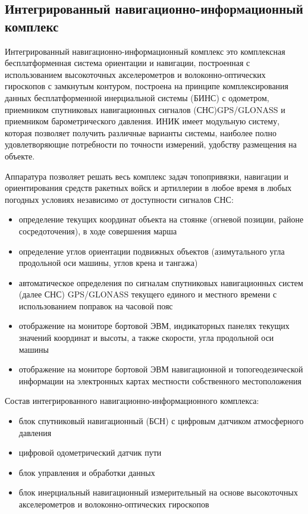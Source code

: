 \subsection{Интегрированный навигационно-информационный комплекс}
\label{sub:lit_review:ins}

Интегрированный навигационно-информационный комплекс это комплексная бесплатформенная система ориентации и навигации,
построенная с использованием высокоточных акселерометров и волоконно-оптических гироскопов с замкнутым контуром,
построена на принципе комплексирования данных бесплатформенной инерциальной системы (БИНС) с одометром, приемником спутниковых навигационных сигналов (СНС)\break GPS/GLONASS и приемником барометрического давления.
ИНИК имеет модульную систему, которая позволяет получить различные варианты системы, наиболее полно удовлетворяющие потребности по точности измерений, удобству размещения на объекте.

Аппаратура позволяет  решать весь комплекс задач топопривязки, навигации и ориентирования средств ракетных войск и артиллерии в любое время в любых погодных условиях независимо от доступности сигналов СНС:
\begin{itemize}
	\item определение текущих координат объекта на стоянке (огневой позиции, районе сосредоточения), в ходе совершения марша
	\item определение углов ориентации подвижных объектов (азимутального угла продольной оси машины, углов крена и тангажа)
	\item автоматическое определения по сигналам спутниковых навигационных систем (далее СНС) GPS/GLONASS текущего единого и местного времени с использованием поправок на часовой пояс
	\item отображение на мониторе бортовой ЭВМ, индикаторных панелях текущих значений координат и высоты, а также скорости, угла продольной оси машины
	\item отображение на мониторе бортовой ЭВМ навигационной и топогеодезической информации на электронных картах местности собственного местоположения
\end{itemize}

Состав интегрированного навигационно-информационного комплекса:
\begin{itemize}
	\item блок спутниковый навигационный (БСН) с цифровым датчиком атмосферного давления
	\item цифровой одометрический датчик пути
	\item блок управления и обработки данных
	\item блок инерциальный навигационный измерительный на основе высокоточных акселерометров и волоконно-оптических гироскопов
\end{itemize}

